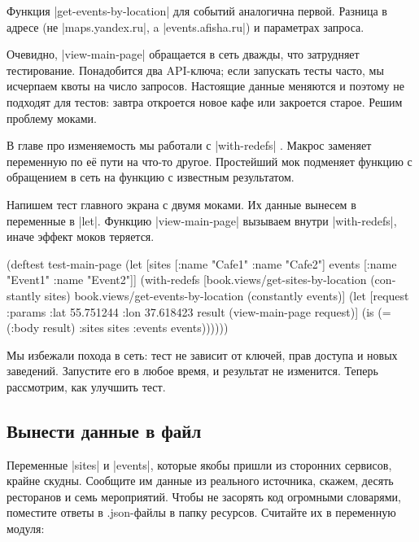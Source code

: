 Функция \spverb|get-events-by-location| для событий аналогична первой. Разница в
адресе (не \spverb|maps.yandex.ru|, a \spverb|events.afisha.ru|) и параметрах
запроса.

Очевидно, \spverb|view-main-page| обращается в сеть дважды, что затрудняет
тестирование. Понадобится два API-ключа; если запускать тесты часто, мы
исчерпаем квоты на число запросов. Настоящие данные меняются и поэтому не
подходят для тестов: завтра откроется новое кафе или закроется старое. Решим
проблему моками.


В главе про изменяемость мы работали с \spverb|with-redefs| .
Макрос заменяет переменную по е\"{е} пути на что-то другое. Простейший мок подменяет
функцию с обращением в сеть на функцию с известным результатом.

Напишем тест главного экрана с двумя моками. Их данные вынесем в переменные в
\spverb|let|. Функцию \spverb|view-main-page| вызываем  внутри
\spverb|with-redefs|, иначе эффект моков теряется.

\begin{english}
  \begin{clojure}
(deftest test-main-page
  (let [sites [{:name "Cafe1"} {:name "Cafe2"}]
        events [{:name "Event1"} {:name "Event2"}]]
    (with-redefs
      [book.views/get-sites-by-location (constantly sites)
       book.views/get-events-by-location (constantly events)]
      (let [request {:params {:lat 55.751244
                              :lon 37.618423}}
            result (view-main-page request)]
        (is (= (:body result)
               {:sites sites :events events}))))))
  \end{clojure}
\end{english}

Мы избежали похода в сеть: тест не зависит от ключей, прав доступа и новых
заведений. Запустите его в любое время, и результат не изменится. Теперь
рассмотрим, как улучшить тест.

\subsection{Вынести данные в файл}

Переменные \spverb|sites| и \spverb|events|, которые якобы пришли из сторонних
сервисов, крайне скудны. Сообщите им данные из реального источника, скажем,
десять ресторанов и семь мероприятий. Чтобы не засорять код огромными словарями,
поместите ответы в .json-файлы в папку ресурсов. Считайте их в переменную
модуля:

